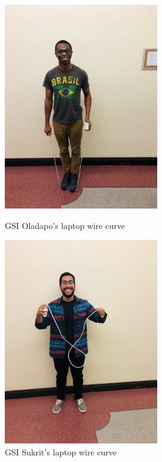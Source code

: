 \begin{enumerate}
\begin{figure}[H]
\begin{minipage}[b]{0.45\textwidth}
    \includegraphics[height=9cm]{figures/oa.jpg}
    \caption{GSI Oladapo's laptop wire curve}
  \end{minipage}
  \hfill
  \begin{minipage}[b]{0.45\textwidth}
    \includegraphics[height=9cm]{figures/sa.jpg}
    \caption{GSI Sukrit's laptop wire curve}
  \end{minipage}
\end{figure}
    \sol{
    
    }

\end{enumerate}
